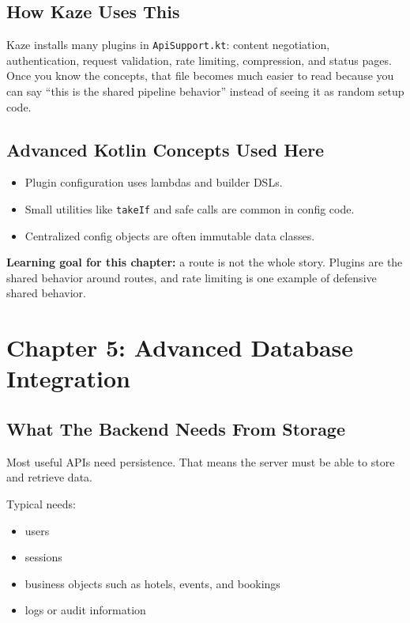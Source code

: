 \documentclass[11pt,a4paper]{article}
\begin{document}
\subsection{How Kaze Uses This}

Kaze installs many plugins in \texttt{ApiSupport.kt}: content negotiation, authentication, request validation, rate limiting, compression, and status pages. Once you know the concepts, that file becomes much easier to read because you can say ``this is the shared pipeline behavior'' instead of seeing it as random setup code.

\subsection{Advanced Kotlin Concepts Used Here}

\begin{itemize}
    \item Plugin configuration uses lambdas and builder DSLs.
    \item Small utilities like \texttt{takeIf} and safe calls are common in config code.
    \item Centralized config objects are often immutable data classes.
\end{itemize}

\begin{kazehighlightbox}
\textbf{Learning goal for this chapter:} a route is not the whole story. Plugins are the shared behavior around routes, and rate limiting is one example of defensive shared behavior.
\end{kazehighlightbox}

\section{Chapter 5: Advanced Database Integration}

\subsection{What The Backend Needs From Storage}

Most useful APIs need persistence. That means the server must be able to store and retrieve data.

Typical needs:
\begin{itemize}
    \item users
    \item sessions
    \item business objects such as hotels, events, and bookings
    \item logs or audit information
\end{itemize}
\end{document}
